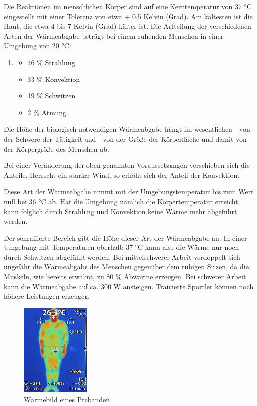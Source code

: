 Die Reaktionen im menschlichen Körper sind auf eine Kerntemperatur von 37 °C eingestellt mit einer Toleranz von etwa + 0,5 Kelvin (Grad). Am kältesten ist die Haut, die etwa 4 bis 7 Kelvin (Grad) kälter ist. Die Aufteilung der verschiedenen Arten der Wärmeabgabe beträgt bei einem ruhenden Menschen in einer Umgebung von 20 °C:

\begin{enumerate}
\item 
\begin{itemize}
	\item  46 \% Strahlung
	\item  33 \% Konvektion
	\item  19 \% Schwitzen
	\item   2 \% Atmung.
\end{itemize}
\end{enumerate}	


Die Höhe der biologisch notwendigen Wärmeabgabe hängt im wesentlichen
- von der Schwere der Tätigkeit und
- von der Größe der Körperfläche 
und damit von der Körpergröße des Menschen ab.

Bei einer Veränderung der oben genannten Voraussetzungen verschieben sich die Anteile. Herrscht ein starker Wind, so erhöht sich der Anteil der Konvektion.

Diese Art der Wärmeabgabe nimmt mit der Umgebungstemperatur bis zum Wert null bei 36 °C ab. Hat die Umgebung nämlich die Körpertemperatur erreicht, kann folglich durch Strahlung und Konvektion keine Wärme mehr abgeführt werden.

Der schraffierte Bereich gibt die Höhe dieser Art der
Wärmeabgabe an. In einer Umgebung mit Temperaturen oberhalb 37 °C kann also die Wärme
nur noch durch Schwitzen abgeführt werden. Bei mittelschwerer Arbeit verdoppelt sich
ungefähr die Wärmeabgabe des Menschen gegenüber dem ruhigen Sitzen, da die Muskeln,
wie bereits erwähnt, zu 80 \% Abwärme erzeugen. Bei schwerer Arbeit kann die Wärmeabgabe auf ca. 300 W ansteigen. Trainierte Sportler können noch höhere Leistungen erzeugen.

\begin{figure}[H]
	\centering
	\includegraphics[width=0.3\textwidth]
	{fig/person_waerme.JPG}
	\caption[Wäermebild eines Probanden]{Wärmebild eines Probanden}
	\label{fig:Waermebild}
\end{figure}


